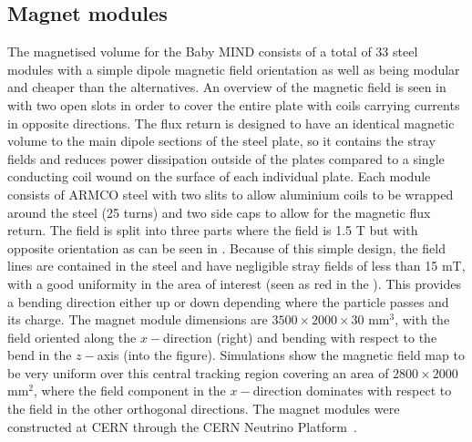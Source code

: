 

\subsection{Magnet modules}

The magnetised volume for the Baby MIND consists of a total of 33 steel modules with a simple dipole magnetic field orientation as well as being modular and cheaper than the alternatives. An overview of the magnetic field is seen in  with two open slots in order to cover the entire plate with coils carrying currents in opposite directions. The flux return is designed to have an identical magnetic volume to the main dipole sections of the steel plate, so it contains the stray fields and reduces power dissipation outside of the plates compared to a single conducting coil wound on the surface of each individual plate. Each module consists of ARMCO steel with two slits to allow aluminium coils to be wrapped around the steel (25 turns) and two side caps to allow for the magnetic flux return. The field is split into three parts where the field is 1.5 T but with opposite orientation as can be seen in . Because of this simple design, the field lines are contained in the steel and have negligible stray fields of less than 15 mT, with a good uniformity in the area of interest (seen as red in the ). This provides a bending direction either up or down depending where the particle passes and its charge. The magnet module dimensions are $3500 \times 2000 \times 30$ mm$^3$, with the field oriented along the $x-$direction (right) and bending with respect to the bend in the $z-$axis (into the figure). Simulations show the magnetic field map to be very uniform over this central tracking region covering an area of $2800 \times 2000$ mm$^2$, where the field component in the $x-$direction dominates with respect to the field in the other orthogonal directions. The magnet modules were constructed at CERN through the CERN Neutrino Platform~\cite{50MagnetMIND}.

